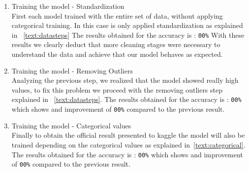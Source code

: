 \documentclass[10pt,conference,compsocconf]{IEEEtran}
\begin{document}
\begin{enumerate}
\item Training the model - Standardization \\
First each model trained with the entire set of data, without applying categorical 
training. In this case is only applied standardization as explained in ~\ref{text:datasteps}
The results obtained for the accuracy is :  \texttt{00\%}
With these results we clearly deduct that more cleaning stages were necessary to understand
the data and achieve that our model behaves as expected.
\item Training the model - Removing Outliers \\
Analyzing the previous step, we realized that the model showed really high values, to fix
this problem we proceed with the removing outliers step explained in ~\ref{text:datasteps}.
The results obtained for the accuracy is :  \texttt{00\%} which shows and improvement of
 \texttt{00\%} compared to the previous result.
\item Training the model - Categorical values \\
 Finally to obtain the official result presented to kaggle the model will also be trained depending
 on the categorical values as explained in~\ref{text:categorical}. The results obtained for the 
 accuracy is :  \texttt{00\%} which shows and improvement of \texttt{00\%} compared to
 the previous result.\\
\end{enumerate}
\end{document}

